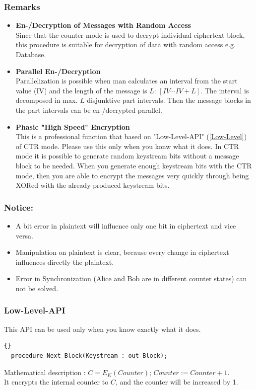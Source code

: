 \subsubsection*{Remarks}
\begin{itemize}
\item \textbf{En-/Decryption of Messages with Random Access}\\
Since that the counter mode is used to decrypt individual ciphertext
block, this procedure is suitable for decryption of data with random
access e.g. Database.
\item \textbf{Parallel En-/Decryption}\\
Parallelization is possible when man calculates an interval from the
start value (IV) and the length of the message is $L$: $[IV\cdots
  IV+L]$. The interval is decomposed in max. $L$ disjunktive part
intervals. Then the message blocks in the part intervals can be
en-/decrypted parallel.
\item \textbf{Phasic "High Speed" Encryption}\\
This is a professional function that based on "Low-Level-API"
(\ref{Low-Level}) of CTR mode. Please use this only when you konw what
it does. In CTR mode it is possible to generate random keystream bits
without a message block to be needed. When you generate enough
keystream bits with the CTR mode, then you are able to encrypt the
messages very quickly through being XORed with the already produced
keystream bits.
\end{itemize}

\subsubsection*{Notice:}
\begin{itemize}
\item A bit error in plaintext will influence only one bit in
  ciphertext and vice versa.
\item Manipulation on plaintext is clear, because every change in
  ciphertext influences directly the plaintext.
\item Error in Synchronization (Alice and Bob are in different counter
  states) can not be solved.
\end{itemize}
\subsubsection*{Low-Level-API}\label{Low-Level}
This API can be used only when you know exactly what it does.
\begin{lstlisting}{}
  procedure Next_Block(Keystream : out Block);
\end{lstlisting}
Mathematical description : $C=E_K(Counter)$; $Counter:=Counter+1$.\\
It encrypts the internal counter to $C$, and the counter will be increased by 1.

